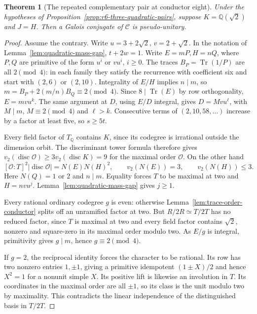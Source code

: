 \documentclass[11pt,reqno]{amsart}
\newtheorem{theorem}{Theorem}[section]
\theoremstyle{remark}\newtheorem{remark}[theorem]{Remark}
\numberwithin{equation}{section}
\begin{document}
\begin{theorem}[The repeated complementary pair at conductor eight]
\label{thm:r6-repeated-pair-eight}
Under the hypotheses of Proposition~\ref{prop:r6-three-quadratic-pairs},
suppose $K=\mathbb Q(\sqrt2)$ and $J=H$. Then a Galois conjugate of
$\mathcal C$ is pseudo-unitary.
\end{theorem}
\begin{proof}
Assume the contrary. Write $u=3+2\sqrt2$, $v=2+\sqrt2$. In the notation
of Lemma~\ref{lem:quadratic-mass-gap}, $t+2w=1$. Write $E=mP,H=nQ$,
where $P,Q$ are primitive of the form $u^i$ or $vu^i$, $i\ge0$.
The traces $B_P=\operatorname{Tr}(1/P)$ are all $2\pmod4$: in each
family they satisfy the recurrence with coefficient six and start with
$(2,6)$ or $(2,10)$. Integrality of $E/H$ implies $n\mid m$, so
$m=B_P+2(m/n)B_Q\equiv2\pmod4$. Since $8\mid\operatorname{Tr}(E)$
by row orthogonality, $E=mvu^k$. The same argument at $D$,
using $E/D$ integral, gives $D=Mvu^\ell$, with $M\mid m$,
$M\equiv2\pmod4$ and $\ell>k$. Consecutive terms of $(2,10,58,\ldots)$
increase by a factor at least five, so $s\ge5t$.

Every field factor of $T_{\mathbb Q}$ contains $K$, since its codegree
is irrational outside the dimension orbit. The discriminant tower
formula therefore gives $v_2(\operatorname{disc}\mathcal O)\ge
3v_2(\operatorname{disc}K)=9$ for the maximal order $\mathcal O$.
On the other hand
\[
 [\mathcal O:T]^2|\operatorname{disc}\mathcal O|
       =N(E)N(H)^2,\qquad
 v_2(N(E))=3,\qquad v_2(N(H))\le3.
\]
Here $N(Q)=1$ or $2$ and $n\mid m$. Equality forces $T$ to be
maximal at two and $H=nvu^j$. Lemma~\ref{lem:quadratic-mass-gap}
gives $j\ge1$.

Every rational ordinary codegree $g$ is even: otherwise
Lemma~\ref{lem:trace-order-conductor} splits off an unramified factor
at two. But $R/2R\simeq T/2T$ has no reduced factor, since $T$ is
maximal at two and every field factor contains $\sqrt2$, nonzero
and square-zero in its maximal order modulo two. As $E/g$ is
integral, primitivity gives $g\mid m$, hence $g\equiv2\pmod4$.

If $g=2$, the reciprocal identity forces the character to be
rational. Its row has two nonzero entries $1,\pm1$, giving a
primitive idempotent $(1\pm X)/2$ and hence $X^2=1$ for a
nonunit simple $X$. Its positive lift is likewise an involution in
$T$. Its coordinates in the maximal order are all $\pm1$, so its
class is the unit modulo two by maximality. This contradicts the
linear independence of the distinguished basis in $T/2T$.


\end{proof}
\end{document}
